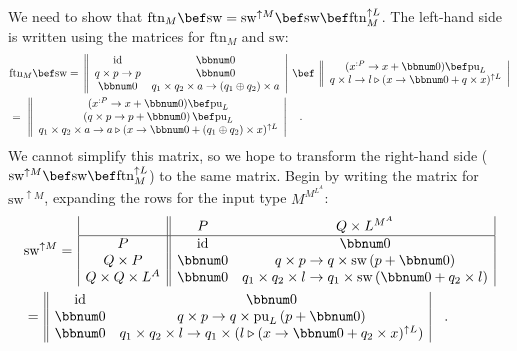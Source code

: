 We need to show that $\text{ftn}_{M}\bef\text{sw}=\text{sw}^{\uparrow M}\bef\text{sw}\bef\text{ftn}_{M}^{\uparrow L}$.
The left-hand side is written using the matrices for $\text{ftn}_{M}$
and $\text{sw}$:
\begin{align}
 & \text{ftn}_{M}\bef\text{sw}=\,\left\Vert \begin{array}{cc}
\text{id} & \bbnum 0\\
q\times p\rightarrow p & \bbnum 0\\
\bbnum 0 & q_{1}\times q_{2}\times a\rightarrow\left(q_{1}\oplus q_{2}\right)\times a
\end{array}\right|\,\bef\,\left\Vert \begin{array}{c}
(x^{:P}\rightarrow x+\bbnum 0)\bef\text{pu}_{L}\\
q\times l\rightarrow l\triangleright(x\rightarrow\bbnum 0+q\times x)^{\uparrow L}
\end{array}\right|\nonumber \\
 & =\,\,\left\Vert \begin{array}{c}
(x^{:P}\rightarrow x+\bbnum 0)\bef\text{pu}_{L}\\
\left(q\times p\rightarrow p+\bbnum 0\right)\bef\text{pu}_{L}\\
q_{1}\times q_{2}\times a\rightarrow a\triangleright(x\rightarrow\bbnum 0+\left(q_{1}\oplus q_{2}\right)\times x)^{\uparrow L}
\end{array}\right|\quad.\label{eq:m-interchange-law-of-swap-linear-monads-left-hand-side}
\end{align}
We cannot simplify this matrix, so we hope to transform the right-hand
side ($\text{sw}^{\uparrow M}\bef\text{sw}\bef\text{ftn}_{M}^{\uparrow L}$)
to the same matrix. Begin by writing the matrix for $\text{sw}^{\uparrow M}$,
expanding the rows for the input type $M^{M^{L^{A}}}$:
\begin{align*}
 & \text{sw}^{\uparrow M}=\,\begin{array}{|c||cc|}
 & P & Q\times L^{M^{A}}\\
\hline P & \text{id} & \bbnum 0\\
Q\times P & \bbnum 0 & q\times p\rightarrow q\times\text{sw}\left(p+\bbnum 0\right)\\
Q\times Q\times L^{A} & \bbnum 0 & q_{1}\times q_{2}\times l\rightarrow q_{1}\times\text{sw}\left(\bbnum 0+q_{2}\times l\right)
\end{array}\\
 & =\,\begin{array}{||cc|}
\text{id} & \bbnum 0\\
\bbnum 0 & q\times p\rightarrow q\times\text{pu}_{L}\left(p+\bbnum 0\right)\\
\bbnum 0 & q_{1}\times q_{2}\times l\rightarrow q_{1}\times(l\triangleright(x\rightarrow\bbnum 0+q_{2}\times x)^{\uparrow L})
\end{array}\quad.
\end{align*}
